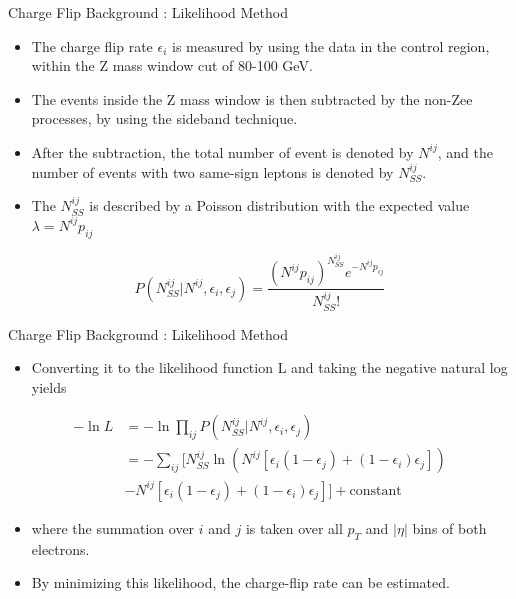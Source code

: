 \documentclass[mathserif,serif]{beamer}
\begin{document}
\begin{frame}{Charge Flip Background : Likelihood Method}
\begin{itemize}
\item The charge flip rate $\epsilon_i$ is measured by using the data in the control region, within the Z mass window cut of 80-100 GeV.
\item The events inside the Z mass window is then subtracted by the non-Zee processes, by using the sideband technique.
\item After the subtraction, the total number of event is denoted by $N^{ij}$, and the number of events with two same-sign leptons is denoted by $N^{ij}_{SS}$.
\item The $N^{ij}_{SS}$ is described by a Poisson distribution with the expected value $\lambda = N^{ij}p_{ij}$
\end{itemize}
\begin{equation*}
P(N^{ij}_{SS} | N^{ij}, \epsilon_i, \epsilon_j) = \frac{(N^{ij}p_{ij})^{N^{ij}_{SS}} e^{-N^{ij}p_{ij}}}{N^{ij}_{SS}!}
\end{equation*}
\end{frame}

\begin{frame}{Charge Flip Background : Likelihood Method}
\begin{itemize}
\item Converting it to the likelihood function L and taking the negative natural log yields
\end{itemize}
\begin{equation*}
\begin{split}
-\ln L &= -\ln\prod_{ij} P(N^{ij}_{SS} | N^{ij}, \epsilon_i, \epsilon_j) \\
&= - \sum_{ij} \Big[ N^{ij}_{SS} \ln (N^{ij}[\epsilon_i (1-\epsilon_j) + (1-\epsilon_i) \epsilon_j]) \\
&- N^{ij}[\epsilon_i (1-\epsilon_j) + (1-\epsilon_i) \epsilon_j] \Big] + \text{constant}
\end{split}
\end{equation*}
\begin{itemize}
\item where the summation over $i$ and $j$ is taken over all $p_T$ and $|\eta|$ bins of both electrons.
\item By minimizing this likelihood, the charge-flip rate can be estimated.
\end{itemize}
\end{frame}
\end{document}
